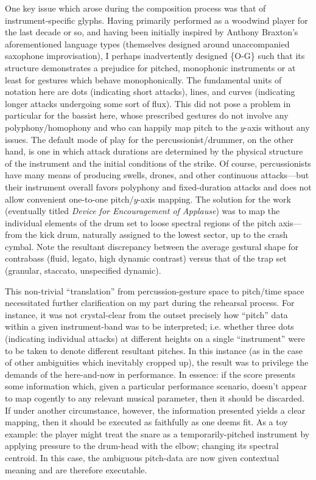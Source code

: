     One key issue which arose during the composition process was that of instrument-specific glyphs. Having primarily performed as a woodwind player for the last decade or so, and having been initially inspired by Anthony Braxton's aforementioned language types (themselves designed around unaccompanied saxophone improvisation), I perhaps inadvertently designed \{O-G\} such that its structure demonstrates a prejudice for pitched, monophonic instruments or at least for gestures which behave monophonically. The fundamental units of notation here are dots (indicating short attacks), lines, and curves (indicating longer attacks undergoing some sort of flux). This did not pose a problem in particular for the bassist here, whose prescribed gestures do not involve any polyphony/homophony and who can happily map pitch to the $y$-axis without any issues. The default mode of play for the percussionist/drummer, on the other hand, is one in which attack durations are determined by the physical structure of the instrument and the initial conditions of the strike. Of course, percussionists have many means of producing swells, drones, and other continuous attacks---but their instrument overall favors polyphony and fixed-duration attacks and does not allow convenient one-to-one pitch/$y$-axis mapping. The solution for the work (eventually titled \textit{Device for Encouragement of Applause}) was to map the individual elements of the drum set to loose spectral regions of the pitch axis---from the kick drum, naturally assigned to the lowest sector, up to the crash cymbal. Note the resultant discrepancy between the average gestural shape for contrabass (fluid, legato, high dynamic contrast) versus that of the trap set (granular, staccato, unspecified dynamic). 
    
    This non-trivial ``translation'' from percussion-gesture space to pitch/time space necessitated further clarification on my part during the rehearsal process. For instance, it was not crystal-clear from the outset precisely how ``pitch'' data within a given instrument-band was to be interpreted; i.e. whether three dots (indicating individual attacks) at different heights on a single ``instrument'' were to be taken to denote different resultant pitches. In this instance (as in the case of other ambiguities which inevitably cropped up), the result was to privilege the demands of the here-and-now in performance. In essence: if the score presents some information which, given a particular performance scenario, doesn't appear to map cogently to any relevant musical parameter, then it should be discarded. If under another circumstance, however, the information presented yields a clear mapping, then it should be executed as faithfully as one deems fit. As a toy example: the player might treat the snare as a temporarily-pitched instrument by applying pressure to the drum-head with the elbow; changing its spectral centroid. In this case, the ambiguous pitch-data are now given contextual meaning and are therefore executable.

